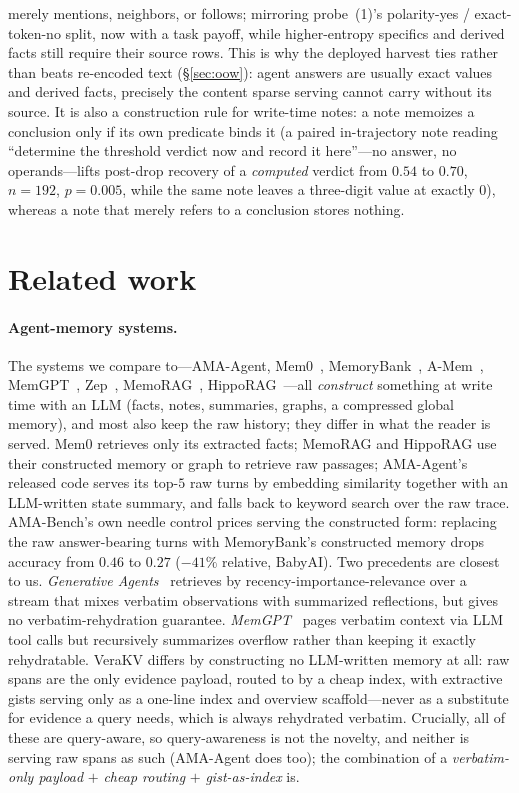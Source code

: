 \documentclass{article} %
\newcommand{\kvm}{VeraKV}
\begin{document}
merely mentions, neighbors, or follows; mirroring probe~(1)'s polarity-yes / exact-token-no
split, now with a task payoff, while higher-entropy specifics and derived facts still require
their source rows. This is why the deployed harvest ties rather than beats re-encoded text
(\S\ref{sec:oow}): agent answers are usually exact values and derived facts, precisely the
content sparse serving cannot carry without its source. It is also a construction rule for
write-time notes: a note memoizes a conclusion only if its own predicate binds it (a paired
in-trajectory note reading ``determine the threshold verdict now and record it here''---no
answer, no operands---lifts post-drop recovery of a \emph{computed} verdict from $0.54$ to
$0.70$, $n{=}192$, $p{=}0.005$, while the same note leaves a three-digit value at exactly
$0$), whereas a note that merely refers to a conclusion stores nothing.

\section{Related work}
\label{sec:related}

\paragraph{Agent-memory systems.}
The systems we compare to---AMA-Agent, Mem0~\citep{mem0},
MemoryBank~\citep{memorybank}, A-Mem~\citep{amem}, MemGPT~\citep{memgpt},
Zep~\citep{zep}, MemoRAG~\citep{memorag}, HippoRAG~\citep{hipporag}---all
\emph{construct} something at write time with an LLM (facts, notes, summaries, graphs, a compressed global memory), and most also keep the raw history; they differ in what the reader is served. Mem0 retrieves only its extracted facts; MemoRAG and HippoRAG use their constructed memory or graph to retrieve raw passages;
AMA-Agent's released code serves its top-$5$ raw turns by embedding similarity together with an LLM-written state summary, and falls back to keyword search over the raw trace. AMA-Bench's own needle control
prices serving the constructed form: replacing the raw answer-bearing turns with MemoryBank's constructed memory drops accuracy from $0.46$ to $0.27$ ($-41\%$ relative, BabyAI). Two precedents are closest to us.
\emph{Generative Agents}~\citep{genagents} retrieves by recency-importance-relevance
over a stream that mixes verbatim observations with summarized reflections, but
gives no verbatim-rehydration guarantee. \emph{MemGPT}~\citep{memgpt} pages
verbatim context via LLM tool calls but recursively summarizes overflow rather
than keeping it exactly rehydratable. \kvm{} differs by constructing no LLM-written memory at all: raw spans are the only evidence
payload, routed to by a cheap index, with extractive gists serving only as a one-line
index and overview scaffold---never as a substitute for evidence a query needs,
which is always rehydrated verbatim.
Crucially, all of these are query-aware, so query-awareness is not the novelty, and neither is serving raw spans as such (AMA-Agent does too);
the combination of a \emph{verbatim-only payload} $+$ \emph{cheap routing} $+$
\emph{gist-as-index} is.
\end{document}

